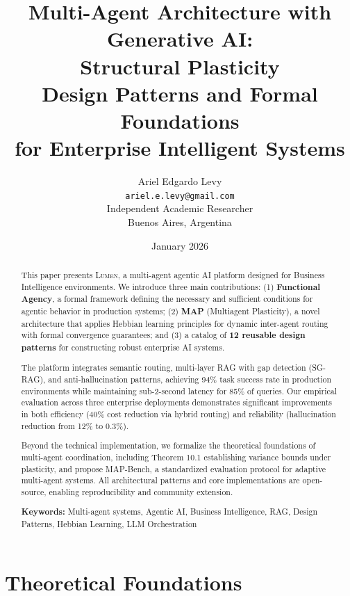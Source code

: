 \documentclass[11pt,a4paper]{article}
\title{\textbf{Multi-Agent Architecture with Generative AI:\\Structural Plasticity}\\[0.5em]
\large Design Patterns and Formal Foundations\\for Enterprise Intelligent Systems}
\author{
    Ariel Edgardo Levy\\
    \texttt{ariel.e.levy@gmail.com}\\
    Independent Academic Researcher\\
    Buenos Aires, Argentina
}
\date{January 2026}
\theoremstyle{definition}
\theoremstyle{remark}
\newcommand{\lumen}{\textsc{Lumen}\xspace}
\newcommand{\map}{\textsc{MAP}\xspace}
\newcommand{\sgrag}{\textsc{SG-RAG}\xspace}
\begin{document}
\maketitle


\begin{abstract}
This paper presents \lumen, a multi-agent agentic AI platform designed for Business Intelligence environments. We introduce three main contributions: (1) \textbf{Functional Agency}, a formal framework defining the necessary and sufficient conditions for agentic behavior in production systems; (2) \textbf{\map} (Multiagent Plasticity), a novel architecture that applies Hebbian learning principles for dynamic inter-agent routing with formal convergence guarantees; and (3) a catalog of \textbf{12 reusable design patterns} for constructing robust enterprise AI systems.

The platform integrates semantic routing, multi-layer RAG with gap detection (\sgrag), and anti-hallucination patterns, achieving 94\% task success rate in production environments while maintaining sub-2-second latency for 85\% of queries. Our empirical evaluation across three enterprise deployments demonstrates significant improvements in both efficiency (40\% cost reduction via hybrid routing) and reliability (hallucination reduction from 12\% to 0.3\%).

Beyond the technical implementation, we formalize the theoretical foundations of multi-agent coordination, including Theorem 10.1 establishing variance bounds under plasticity, and propose MAP-Bench, a standardized evaluation protocol for adaptive multi-agent systems. All architectural patterns and core implementations are open-source, enabling reproducibility and community extension.

\vspace{0.5em}
\noindent\textbf{Keywords:} Multi-agent systems, Agentic AI, Business Intelligence, RAG, Design Patterns, Hebbian Learning, LLM Orchestration
\end{abstract}

\newpage


\part{Theoretical Foundations}
\end{document}
